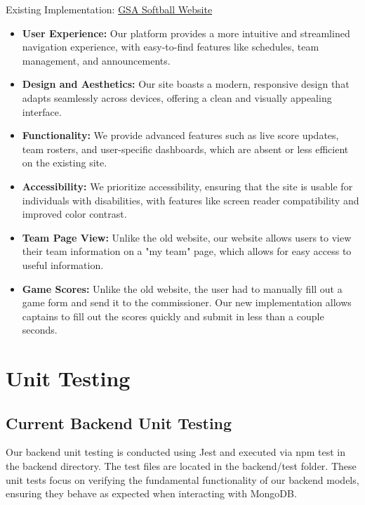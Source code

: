 \documentclass[12pt, titlepage]{article}
\begin{document}
Existing Implementation: \href{https://www.gsasoftball.ca/}{GSA Softball Website}

    \begin{itemize}
        \item \textbf{User Experience:} Our platform provides a more intuitive and streamlined navigation experience, with easy-to-find features like schedules, team management, and announcements.
        \item \textbf{Design and Aesthetics:} Our site boasts a modern, responsive design that adapts seamlessly across devices, offering a clean and visually appealing interface.
        \item \textbf{Functionality:} We provide advanced features such as live score updates, team rosters, and user-specific dashboards, which are absent or less efficient on the existing site.
        \item \textbf{Accessibility:} We prioritize accessibility, ensuring that the site is usable for individuals with disabilities, with features like screen reader compatibility and improved color contrast.
         \item \textbf{Team Page View:} Unlike the old website, our website allows users to view their team information on a "my team" page, which allows for easy access to useful information.
         \item \textbf{Game Scores:} Unlike the old website, the user had to manually fill out a game form and send it to the commissioner. Our new implementation allows captains to fill out the scores quickly and submit in less than a couple seconds.
    \end{itemize}

\section{Unit Testing}

\subsection{Current Backend Unit Testing}

Our backend unit testing is conducted using Jest and executed via npm test in the backend directory. The test files are located in the backend/test folder. These unit tests focus on verifying the fundamental functionality of our backend models, ensuring they behave as expected when interacting with MongoDB.
\end{document}
